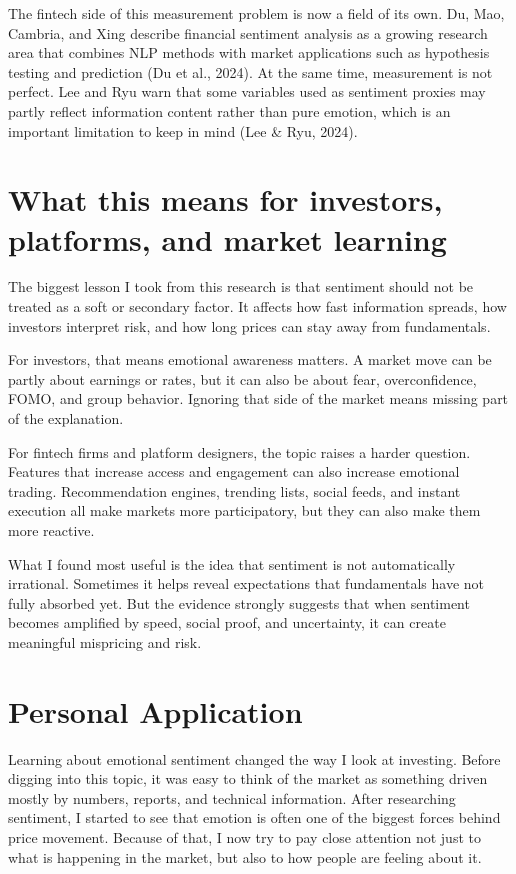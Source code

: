 \documentclass[12pt]{article}
\begin{document}
The fintech side of this measurement problem is now a field of its own. Du, Mao, Cambria, and Xing describe financial sentiment analysis as a growing research area that combines NLP methods with market applications such as hypothesis testing and prediction (Du et al., 2024). At the same time, measurement is not perfect. Lee and Ryu warn that some variables used as sentiment proxies may partly reflect information content rather than pure emotion, which is an important limitation to keep in mind (Lee \& Ryu, 2024).

\section{What this means for investors, platforms, and market learning}

The biggest lesson I took from this research is that sentiment should not be treated as a soft or secondary factor. It affects how fast information spreads, how investors interpret risk, and how long prices can stay away from fundamentals.

For investors, that means emotional awareness matters. A market move can be partly about earnings or rates, but it can also be about fear, overconfidence, FOMO, and group behavior. Ignoring that side of the market means missing part of the explanation.

For fintech firms and platform designers, the topic raises a harder question. Features that increase access and engagement can also increase emotional trading. Recommendation engines, trending lists, social feeds, and instant execution all make markets more participatory, but they can also make them more reactive.

What I found most useful is the idea that sentiment is not automatically irrational. Sometimes it helps reveal expectations that fundamentals have not fully absorbed yet. But the evidence strongly suggests that when sentiment becomes amplified by speed, social proof, and uncertainty, it can create meaningful mispricing and risk.

\section{Personal Application}

Learning about emotional sentiment changed the way I look at investing. Before digging into this topic, it was easy to think of the market as something driven mostly by numbers, reports, and technical information. After researching sentiment, I started to see that emotion is often one of the biggest forces behind price movement. Because of that, I now try to pay close attention not just to what is happening in the market, but also to how people are feeling about it.
\end{document}
